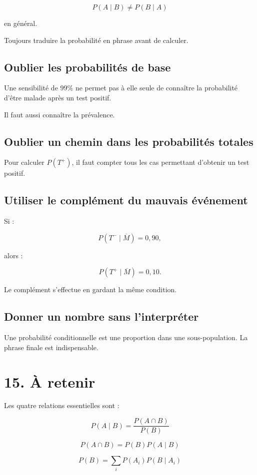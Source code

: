 {{\[
P(A\mid B)
\neq
P(B\mid A)
\]

en général.

Toujours traduire la probabilité en phrase avant de calculer.

\subsection{Oublier les probabilités de base}

Une sensibilité de $99\%$ ne permet pas à elle seule de connaître la probabilité d'être malade après un test positif.

Il faut aussi connaître la prévalence.

\subsection{Oublier un chemin dans les probabilités totales}

Pour calculer $P(T^+)$, il faut compter tous les cas permettant d'obtenir un test positif.

\subsection{Utiliser le complément du mauvais événement}

Si :

\[
P(T^-\mid\overline M)=0{,}90,
\]

alors :

\[
P(T^+\mid\overline M)=0{,}10.
\]

Le complément s'effectue en gardant la même condition.

\subsection{Donner un nombre sans l'interpréter}

Une probabilité conditionnelle est une proportion dans une sous-population. La phrase finale est indispensable.


\section{15. À retenir}

Les quatre relations essentielles sont :

\[
\boxed{
P(A\mid B)=\frac{P(A\cap B)}{P(B)}
}
\]

\[
\boxed{
P(A\cap B)=P(B)P(A\mid B)
}
\]

\[
\boxed{
P(B)=\sum_i P(A_i)P(B\mid A_i)
}
\]

}}
